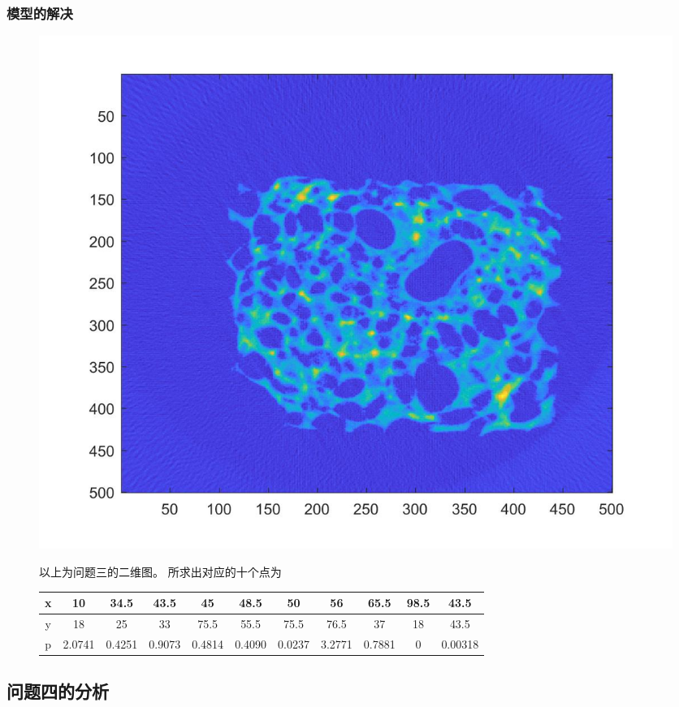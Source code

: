 \documentclass[withoutpreface,bwprint]{cumcmthesis} %
\begin{document}
\subsubsection {模型的解决}
\begin{figure}[H]
\centering
\includegraphics[width=.6\textwidth]{8.jpg}



以上为问题三的二维图。
所求出对应的十个点为
\begin{center}
\begin{tabular}{|c|c|c|c|c|c|c|c|c|c|c|}
 \hline
x    &  10   & 34.5   &  43.5       &  45          &  48.5        &  50           &  56          &  65.5      &  98.5   &  43.5\\ \hline 
y    &    18 &  25    &  33           &  75.5        &  55.5       &  75.5        &  76.5       &  37      &  18   &  43.5   \\ \hline
p    &   2.0741   &  0.4251      &0.9073   &  0.4814   & 0.4090   & 0.0237 & 3.2771   &  0.7881       &  0   &  0.00318\\ \hline
\end{tabular}
\end{center}
\end{figure}
\subsection{问题四的分析}
\end{document}
